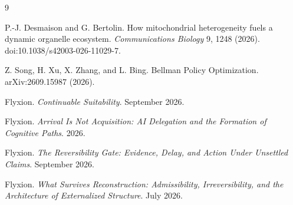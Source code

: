 \documentclass[11pt]{article}
\theoremstyle{remark}
\begin{document}
\begin{thebibliography}{9}

P.-J. Desmaison and G. Bertolin.
How mitochondrial heterogeneity fuels a dynamic organelle ecosystem.
\emph{Communications Biology} 9, 1248 (2026).
doi:10.1038/s42003-026-11029-7.

Z. Song, H. Xu, X. Zhang, and L. Bing.
Bellman Policy Optimization.
arXiv:2609.15987 (2026).

Flyxion.
\emph{Continuable Suitability}.
September 2026.

Flyxion.
\emph{Arrival Is Not Acquisition: AI Delegation and the Formation of Cognitive Paths}.
2026.

Flyxion.
\emph{The Reversibility Gate: Evidence, Delay, and Action Under Unsettled Claims}.
September 2026.

Flyxion.
\emph{What Survives Reconstruction: Admissibility, Irreversibility, and the Architecture of Externalized Structure}.
July 2026.

\end{thebibliography}
\end{document}
